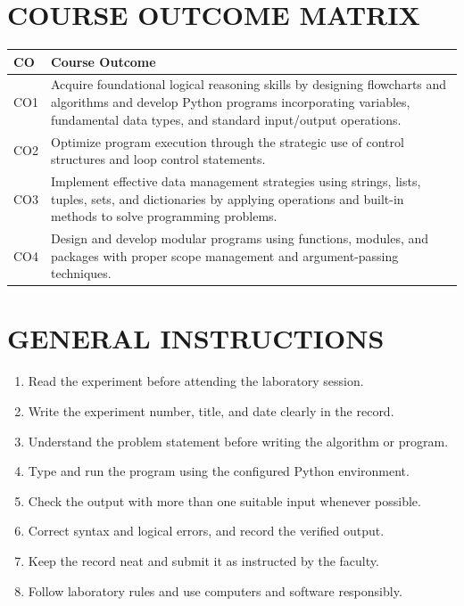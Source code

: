\documentclass[12pt,a4paper]{report}
\begin{document}
\chapter*{COURSE OUTCOME MATRIX}
\begin{longtable}{>{\centering\arraybackslash}p{1.7cm}p{11cm}}
\toprule
\textbf{CO} & \textbf{Course Outcome}\\
\midrule
CO1 & Acquire foundational logical reasoning skills by designing flowcharts and algorithms and develop Python programs incorporating variables, fundamental data types, and standard input/output operations.\\
CO2 & Optimize program execution through the strategic use of control structures and loop control statements.\\
CO3 & Implement effective data management strategies using strings, lists, tuples, sets, and dictionaries by applying operations and built-in methods to solve programming problems.\\
CO4 & Design and develop modular programs using functions, modules, and packages with proper scope management and argument-passing techniques.\\
\bottomrule
\end{longtable}

\chapter*{GENERAL INSTRUCTIONS}
\begin{enumerate}
\item Read the experiment before attending the laboratory session.
\item Write the experiment number, title, and date clearly in the record.
\item Understand the problem statement before writing the algorithm or program.
\item Type and run the program using the configured Python environment.
\item Check the output with more than one suitable input whenever possible.
\item Correct syntax and logical errors, and record the verified output.
\item Keep the record neat and submit it as instructed by the faculty.
\item Follow laboratory rules and use computers and software responsibly.
\end{enumerate}
\end{document}
